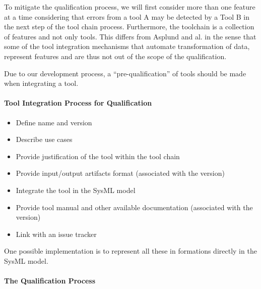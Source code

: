 To mitigate the qualification process, we will first consider more
than one feature at a time considering that errors from a tool A may
be detected by a Tool B in the next step of the tool chain process.
Furthermore, the toolchain is a collection
of features and not only tools. This differs from Asplund and al. in the sense that
some of the tool integration mechanisms that automate transformation of data, represent features
 and are thus not out of the scope of the qualification.

Due to our development process, a ``pre-qualification'' of tools should be made
when integrating a tool.

\paragraph{Tool Integration Process for Qualification}

\begin{itemize}
\item Define name and version
\item Describe use cases
\item Provide justification of the tool within the tool chain
\item Provide input/output artifacts format (associated with the
  version)
\item Integrate the tool in the SysML model
\item Provide tool manual and other available documentation (associated with the version)
\item Link with an issue tracker
\end{itemize}

One possible implementation is to represent all these in formations
directly in the SysML model.

\paragraph{The Qualification Process}

